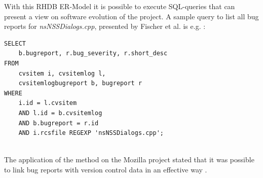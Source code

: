 With this RHDB ER-Model it is possible to execute SQL-queries that can present a view on software evolution of the project. A sample query to list all bug reports for \textit{nsNSSDialogs.cpp}, presented by Fischer et al. is e.g. \cite{fischer2003populating}:

\begin{verbatim}
SELECT
	b.bugreport, r.bug_severity, r.short_desc
FROM
	cvsitem i, cvsitemlog l,
	cvsitemlogbugreport b, bugreport r
WHERE 	
	i.id = l.cvsitem
	AND l.id = b.cvsitemlog
	AND b.bugreport = r.id
	AND i.rcsfile REGEXP 'nsNSSDialogs.cpp';
	
\end{verbatim}

The application of the method on the Mozilla project stated that it was possible to link bug reports with version control data in an effective way \cite{fischer2003populating}. 

